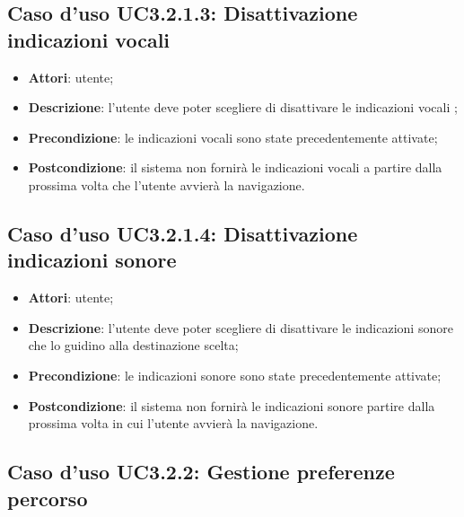 \documentclass[../AnalisiDeiRequisiti.tex]{subfiles}
\begin{document}
\subsection{Caso d'uso UC3.2.1.3: Disattivazione indicazioni vocali}
\begin{itemize}
\item \textbf{Attori}: utente;
\item \textbf{Descrizione}: l'utente deve poter scegliere di disattivare le indicazioni vocali ; 
      \item \textbf{Precondizione}: le indicazioni vocali sono state precedentemente attivate;
    \item \textbf{Postcondizione}: il sistema non fornirà le indicazioni vocali a partire dalla prossima volta che l'utente avvierà la navigazione.
  \end{itemize}
\hypertarget{UC3.2.1.4}{}
\subsection{Caso d'uso UC3.2.1.4: Disattivazione indicazioni sonore}
\begin{itemize}
\item \textbf{Attori}: utente;
\item \textbf{Descrizione}: l'utente deve poter scegliere di disattivare le indicazioni sonore che lo guidino alla destinazione scelta; 
      \item \textbf{Precondizione}: le indicazioni sonore sono state precedentemente attivate;
    \item \textbf{Postcondizione}: il sistema non fornirà le indicazioni sonore partire dalla prossima volta in cui l'utente avvierà la navigazione.
  \end{itemize}
\hypertarget{UC3.2.2}{}
\subsection{Caso d'uso UC3.2.2: Gestione preferenze percorso}
\end{document}
